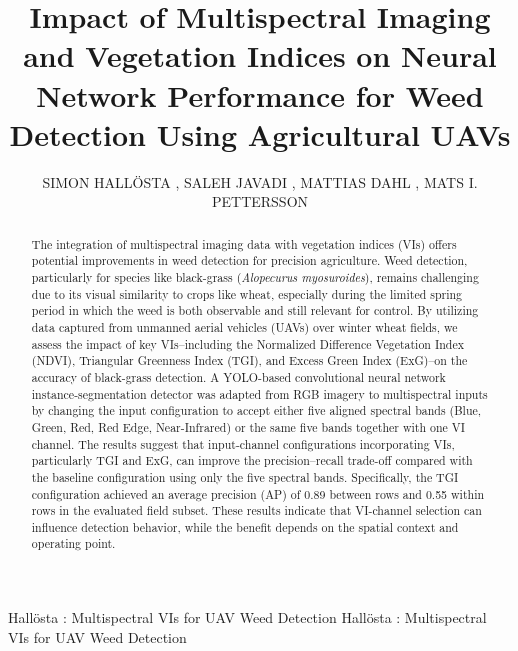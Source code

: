 \documentclass{ieeeaccess}
\begin{document}



\title{Impact of Multispectral Imaging and Vegetation Indices on Neural Network Performance for Weed Detection Using Agricultural UAVs}


\author{\uppercase{Simon Hallösta}
, 
\uppercase{Saleh Javadi}
, 
\uppercase{Mattias Dahl}
,
\uppercase{Mats I. Pettersson}
}


\address[1]{Department of Mathematics and Natural Sciences, Blekinge Institute of Technology, 371 79 Karlskrona, Sweden}


\markboth
{Hallösta \headeretal: Multispectral VIs for UAV Weed Detection}
{Hallösta \headeretal: Multispectral VIs for UAV Weed Detection}




\begin{abstract}




The integration of multispectral imaging data with vegetation indices (VIs) offers potential improvements in weed detection for precision agriculture. Weed detection, particularly for species like black-grass (\textit{Alopecurus myosuroides}), remains challenging due to its visual similarity to crops like wheat, especially during the limited spring period in which the weed is both observable and still relevant for control. By utilizing data captured from unmanned aerial vehicles (UAVs) over winter wheat fields, we assess the impact of key VIs--including the Normalized Difference Vegetation Index (NDVI), Triangular Greenness Index (TGI), and Excess Green Index (ExG)--on the accuracy of black-grass detection. A YOLO-based convolutional neural network instance-segmentation detector was adapted from RGB imagery to multispectral inputs by changing the input configuration to accept either five aligned spectral bands (Blue, Green, Red, Red Edge, Near-Infrared) or the same five bands together with one VI channel.
The results suggest that input-channel configurations incorporating VIs, particularly TGI and ExG, can improve the precision--recall trade-off compared with the baseline configuration using only the five spectral bands. Specifically, the TGI configuration achieved an average precision (AP) of 0.89 between rows and 0.55 within rows in the evaluated field subset. These results indicate that VI-channel selection can influence detection behavior, while the benefit depends on the spatial context and operating point.


\end{abstract}
\end{document}
